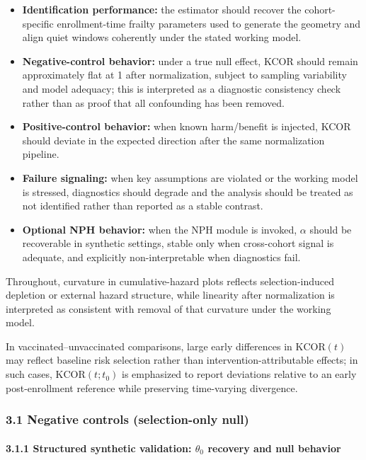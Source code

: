 \documentclass[
]{article}
\providecommand{\tightlist}{%
  \setlength{\itemsep}{0pt}\setlength{\parskip}{0pt}}
\begin{document}
\begin{itemize}
\tightlist
\item
  \textbf{Identification performance:} the estimator should recover the
  cohort-specific enrollment-time frailty parameters used to generate
  the geometry and align quiet windows coherently under the stated
  working model.
\item
  \textbf{Negative-control behavior:} under a true null effect, KCOR
  should remain approximately flat at 1 after normalization, subject to
  sampling variability and model adequacy; this is interpreted as a
  diagnostic consistency check rather than as proof that all confounding
  has been removed.
\item
  \textbf{Positive-control behavior:} when known harm/benefit is
  injected, KCOR should deviate in the expected direction after the same
  normalization pipeline.
\item
  \textbf{Failure signaling:} when key assumptions are violated or the
  working model is stressed, diagnostics should degrade and the analysis
  should be treated as not identified rather than reported as a stable
  contrast.
\item
  \textbf{Optional NPH behavior:} when the NPH module is invoked,
  \(\alpha\) should be recoverable in synthetic settings, stable only
  when cross-cohort signal is adequate, and explicitly non-interpretable
  when diagnostics fail.
\end{itemize}

Throughout, curvature in cumulative-hazard plots reflects
selection-induced depletion or external hazard structure, while
linearity after normalization is interpreted as consistent with removal
of that curvature under the working model.

In vaccinated--unvaccinated comparisons, large early differences in
\(\mathrm{KCOR}(t)\) may reflect baseline risk selection rather than
intervention-attributable effects; in such cases,
\(\mathrm{KCOR}(t; t_0)\) is emphasized to report deviations relative to
an early post-enrollment reference while preserving time-varying
divergence.

\subsubsection{3.1 Negative controls (selection-only
null)}\label{negative-controls-selection-only-null}

\paragraph{\texorpdfstring{3.1.1 Structured synthetic validation:
\(\theta_0\) recovery and null
behavior}{3.1.1 Structured synthetic validation: \textbackslash theta\_0 recovery and null behavior}}\label{structured-synthetic-validation-theta_0-recovery-and-null-behavior}
\end{document}
